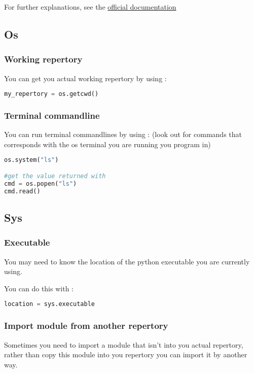 \documentclass[a4paper, 12pt, titlepage]{scrartcl} %
\begin{document}
\vspace{5mm}

For further explanations, see the \href{https://docs.python.org/3/library/hashlib.html}{official documentation}


\subsection{Os}
\subsubsection{Working repertory}
You can get you actual working repertory by using :
\begin{lstlisting}[language=Python]
my_repertory = os.getcwd()
\end{lstlisting} \vspace{5mm}

\subsubsection{Terminal commandline}
You can run terminal commandlines by using : (look out for commands that corresponds with the os terminal you are running you program in)
\begin{lstlisting}[language=Python]
os.system("ls")

#get the value returned with
cmd = os.popen("ls")
cmd.read()
\end{lstlisting} \vspace{5mm}

\subsection{Sys}
\subsubsection{Executable}
You may need to know the location of the python executable you are currently using. 

You can do this with :
\begin{lstlisting}[language=Python]
location = sys.executable
\end{lstlisting} \vspace{5mm}

\subsubsection{Import module from another repertory}
Sometimes you need to import a module that isn't into you actual repertory, rather than copy this module into you repertory you can import it by another way. 
\end{document}
